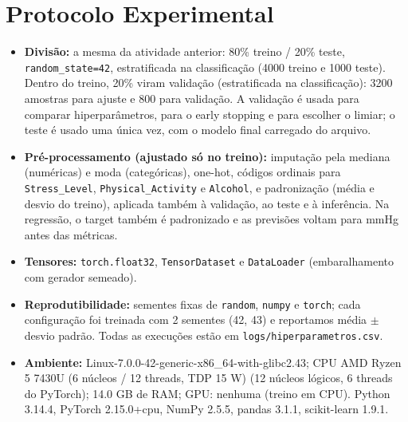\documentclass[11pt,a4paper]{article}
\begin{document}
\section{Protocolo Experimental}
\begin{itemize}
\item \textbf{Divisão:} a mesma da atividade anterior: 80\% treino / 20\% teste, \texttt{random\_state=42}, estratificada na classificação
(4000 treino e 1000 teste). Dentro do treino, 20\% viram validação (estratificada na classificação): 3200 amostras para
ajuste e 800 para validação. A validação é usada para comparar hiperparâmetros, para o early stopping e para escolher o limiar;
o teste é usado uma única vez, com o modelo final carregado do arquivo.
\item \textbf{Pré-processamento (ajustado só no treino):} imputação pela mediana (numéricas) e moda (categóricas), one-hot, códigos
ordinais para \texttt{Stress\_Level}, \texttt{Physical\_Activity} e \texttt{Alcohol}, e padronização (média e desvio do treino),
aplicada também à validação, ao teste e à inferência. Na regressão, o target também é padronizado e as previsões voltam para mmHg antes das métricas.
\item \textbf{Tensores:} \texttt{torch.float32}, \texttt{TensorDataset} e \texttt{DataLoader} (embaralhamento com gerador semeado).
\item \textbf{Reprodutibilidade:} sementes fixas de \texttt{random}, \texttt{numpy} e \texttt{torch}; cada configuração foi treinada com
2 sementes (42, 43) e reportamos média $\pm$ desvio padrão. Todas as execuções estão em \texttt{logs/hiperparametros.csv}.
\item \textbf{Ambiente:} Linux-7.0.0-42-generic-x86\_64-with-glibc2.43; CPU AMD Ryzen 5 7430U (6 núcleos / 12 threads, TDP 15 W) (12 núcleos lógicos, 6 threads do PyTorch);
14.0 GB de RAM; GPU: nenhuma (treino em CPU). Python 3.14.4, PyTorch 2.15.0+cpu, NumPy 2.5.5,
pandas 3.1.1, scikit-learn 1.9.1.
\end{itemize}
\end{document}
